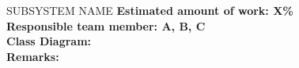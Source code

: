 \begin{subsection}{SUBSYSTEM NAME}
	\textbf{Estimated amount of work: X\%} \\
	\textbf{Responsible team member: A, B, C} \\
	\textbf{Class Diagram:} \\
	
	\textbf{Remarks:} \\
	
\end{subsection}